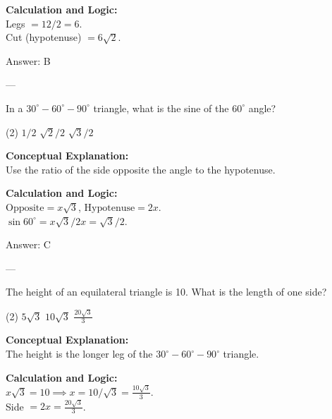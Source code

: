 \documentclass[11pt,paper=a4,answers]{exam}
\begin{document}
\begin{questions}
\begin{solution}
\vspace{10pt}
\textbf{Calculation and Logic:} \\
Legs $= 12/2 = 6$. \\
Cut (hypotenuse) $= 6\sqrt{2}$.

\vspace{15pt}
Answer: \colorbox{yellow!100}{B}
\end{solution}

---

\question
In a $30^\circ-60^\circ-90^\circ$ triangle, what is the sine of the $60^\circ$ angle?
\begin{tasks}(2)
    \task $1/2$
    \task $\sqrt{2}/2$
    \task $\sqrt{3}/2$
\end{tasks}

\begin{solution}
\textbf{Conceptual Explanation:} \\
Use the ratio of the side opposite the angle to the hypotenuse.

\vspace{10pt}
\textbf{Calculation and Logic:} \\
$\text{Opposite} = x\sqrt{3}$, $\text{Hypotenuse} = 2x$. \\
$\sin 60^\circ = x\sqrt{3} / 2x = \sqrt{3}/2$.

\vspace{15pt}
Answer: \colorbox{yellow!100}{C}
\end{solution}

---

\question
The height of an equilateral triangle is 10. What is the length of one side?
\begin{tasks}(2)
    \task $5\sqrt{3}$
    \task $10\sqrt{3}$
    \task $\frac{20\sqrt{3}}{3}$
\end{tasks}

\begin{solution}
\textbf{Conceptual Explanation:} \\
The height is the longer leg of the $30^\circ-60^\circ-90^\circ$ triangle.

\vspace{10pt}
\textbf{Calculation and Logic:} \\
$x\sqrt{3} = 10 \implies x = 10/\sqrt{3} = \frac{10\sqrt{3}}{3}$. \\
Side $= 2x = \frac{20\sqrt{3}}{3}$.


\end{solution}
\end{questions}
\end{document}
